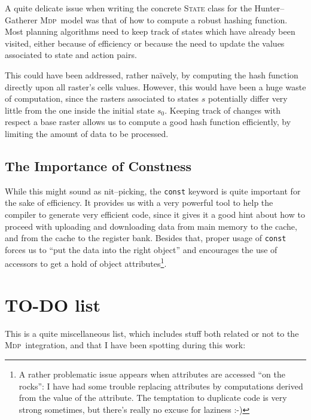 \documentclass[a4paper,10pt]{article}
\newcommand{\mdp}{\textsc{Mdp}}
\begin{document}
A quite delicate issue when writing the concrete \textsc{State} class for the Hunter--Gatherer \mdp~model was that of
how to compute a robust hashing function. Most planning algorithms need to keep track of states which have already
been visited, either because of efficiency or because the need to update the values associated to state and action
pairs.

This could have been addressed, rather naïvely, by computing the hash function directly upon all raster's cells values. However,
this would have been a huge waste of computation, since the rasters associated to states $s$ potentially differ very 
little from the one inside the initial state $s_0$. Keeping track of changes with respect a base raster allows us to compute
a good hash function efficiently, by limiting the amount of data to be processed.

\subsection{The Importance of Constness}
\label{constness}

While this might sound as nit--picking, the \texttt{const} keyword is quite important for the sake of efficiency. It provides
us with a very powerful tool to help the compiler to generate very efficient code, since it gives it a good hint about how to
proceed with uploading and downloading data from main memory to the cache, and from the cache to the register bank. Besides
that, proper usage of \texttt{const} forces us to ``put the data into the right object'' and encourages the use of accessors
to get a hold of object attributes\footnote{A rather problematic issue appears when attributes are accessed ``on the rocks'':
I have had some trouble replacing attributes by computations derived from the value of the attribute. The temptation
to duplicate code is very strong sometimes, but there's really no excuse for laziness :-)}.

\section{TO-DO list}

This is a quite miscellaneous list, which includes stuff both related or not to the \mdp~integration, and that I have been
spotting during this work:
\end{document}
